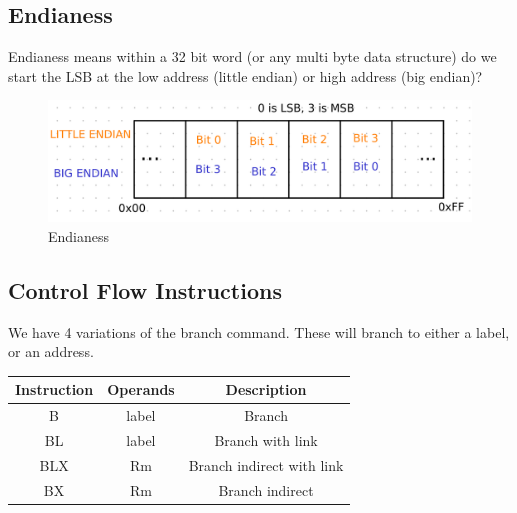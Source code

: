\documentclass[12pt,letterpaper]{article} \usepackage{amsmath} \usepackage{graphicx} \usepackage[margin=1in]{geometry} \usepackage{longtable}  \usepackage{amssymb}
\begin{document}
	\subsection{Endianess}
	Endianess means within a 32 bit word (or any multi byte data structure) do we start the LSB at the low address (little endian) or high address (big endian)?
	
	\begin{figure}[h!]
		\centering
		\includegraphics[width=0.5\linewidth]{images/endian}
		\caption{Endianess}
		\label{fig:endian}
	\end{figure}
	
	\subsection{Control Flow Instructions}
	We have 4 variations of the branch command. These will branch to either a label, or an address. 
	\begin{center}
		\begin{tabular}{|c|c|c|}
			\hline
			Instruction & Operands & Description \\
			\hline\hline
			B & label & Branch \\
			\hline
			BL & label & Branch with link \\
			\hline
			BLX & Rm & Branch indirect with link \\
			\hline
			BX & Rm & Branch indirect \\
			\hline
		\end{tabular}
	\end{center}
	
\end{document}
